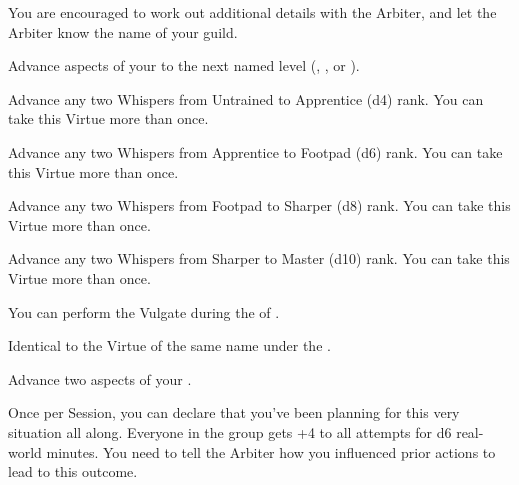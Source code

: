 \begin{multicols*}{2}
You are encouraged to work out additional details with the Arbiter, and let the Arbiter know the name of your guild.


Advance  aspects of your  to the next named level (\DEATH, \INJURY, or \INSANITY).


Advance any two Whispers from Untrained to Apprentice (d4) rank. You can take this Virtue more than once.


Advance any two Whispers from Apprentice to Footpad (d6) rank. You can take this Virtue more than once.


Advance any two Whispers from Footpad to Sharper (d8) rank. You can take this Virtue more than once.


Advance any two Whispers from Sharper to Master (d10) rank. You can take this Virtue more than once.


You can perform the  Vulgate during the  of . 


Identical to the Virtue of the same name under the .



Advance two  aspects of your  \DCUP.


Once per Session, you can declare that you’ve been planning for this very situation all along. Everyone in the group gets +4 to all \RO attempts for d6 real-world minutes.  You need to tell the Arbiter how you influenced prior actions to lead to this outcome. 


\end{multicols*}

